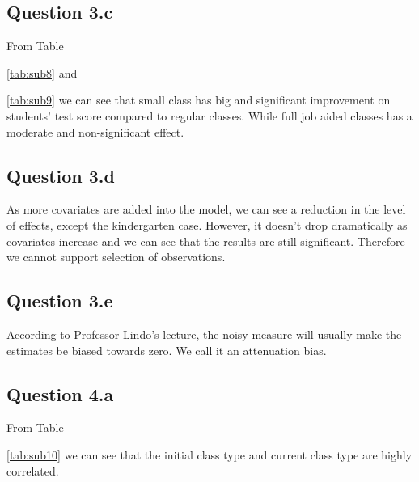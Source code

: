 \documentclass{article}
\begin{document}
{{{{{{{{{{{{{\subsection*{Question 3.c}

From Table {\ref{tab:sub8} and {\ref{tab:sub9} we can see that small class has big and significant improvement on students' test score compared to regular classes. While full job aided classes has a moderate and non-significant effect.

\subsection*{Question 3.d}

As more covariates are added into the model, we can see a reduction in the level of effects, except the kindergarten case. However, it doesn't drop dramatically as covariates increase and we can see that the results are still significant. Therefore we cannot support selection of observations.

\subsection*{Question 3.e}

According to Professor Lindo's lecture, the noisy measure will usually make the estimates be biased towards zero. We call it an attenuation bias.



\subsection*{Question 4.a}

From Table {\ref{tab:sub10} we can see that the initial class type and current class type are highly correlated. 

}}}}}}}}}}}}}}}}
\end{document}
